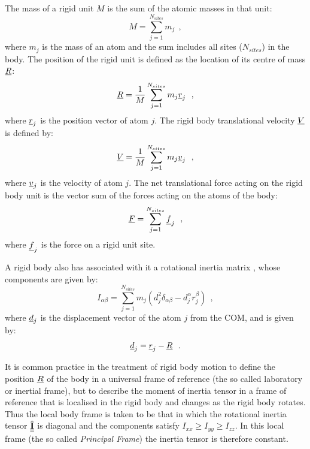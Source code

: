 The mass of a rigid unit $M$ is the sum of the atomic masses in that unit:
\begin{equation}
M = \sum_{j=1}^{N_{sites}} m_{j}~~, \label{netmass}
\end{equation}
where $m_{j}$ is the mass of an atom and the sum includes all sites
($N_{sites}$) in the body.  The position of the rigid unit is defined
as the location of its centre of mass $\mbox{$\underline{R}$}$:
\begin{equation}
\mbox{$\underline{R}$} = {1 \over M}\sum_{j=1}^{N_{sites}} m_{j} \mbox{$\underline{r}$}_{j}~~,
\end{equation}
where $\mbox{$\underline{r}$}_{j}$ is the position vector of atom $j$.  The rigid body
translational velocity $\mbox{$\underline{V}$}$ is defined by:
\begin{equation}
\mbox{$\underline{V}$} = {1 \over M}\sum_{j=1}^{N_{sites}} m_{j} \mbox{$\underline{v}$}_{j}~~,
\end{equation}
where $\mbox{$\underline{v}$}_{j}$ is the velocity of atom $j$.
The net translational force acting on the rigid body unit is the vector sum
of the forces acting on the atoms of the body:
\begin{equation}
\mbox{$\underline{F}$} = \sum_{j=1}^{N_{sites}} \mbox{$\underline{f}$}_{j}~~, \label{netforce}
\end{equation}
where $\mbox{$\underline{f}$}_{j}$ is the force on a rigid unit site.

A rigid body also has associated with it a
rotational inertia matrix , whose components are given by:
\begin{equation}
I_{\alpha\beta}=\sum_{j=1}^{N_{sites}} m_{j} (d_{j}^{2}
\delta_{\alpha \beta}-d_{j}^{\alpha} r_{j}^{\beta})~~,
\end{equation}
where $\mbox{$\underline{d}$}_{j}$ is the displacement vector of the atom $j$ from the
COM, and is given by:
\begin{equation}
\mbox{$\underline{d}$}_{j}=\mbox{$\underline{r}$}_{j}-\mbox{$\underline{R}$}~~.
\end{equation}

It is common practice in the treatment of rigid body motion to define
the position $\mbox{$\underline{R}$}$ of the body in a universal frame of reference
(the so called laboratory or inertial frame), but to describe the
moment of inertia tensor in a frame of reference that is localised
in the rigid body and changes as the rigid body rotates.  Thus the
local body frame is taken to be that in which the rotational
inertia tensor $\hat{\mbox{$\underline{\underline{\bf I}}$}}$ is diagonal and the components satisfy
$I_{xx} \ge I_{yy} \ge I_{zz}$.  In this local frame (the so called
{\em Principal Frame}) the inertia tensor is therefore constant.

